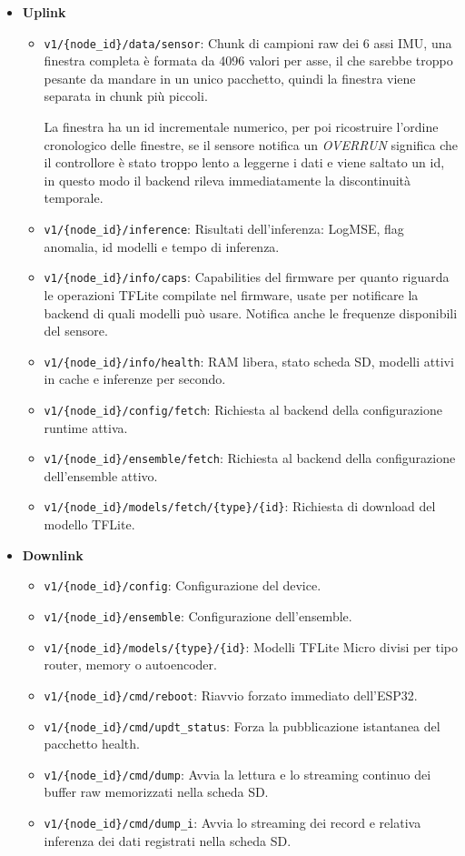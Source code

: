 \begin{itemize}
	\item \textbf{Uplink}
	\begin{itemize}
		\item \texttt{v1/\{node\_id\}/data/sensor}: Chunk di campioni raw dei 6 assi IMU, una finestra completa è formata da 4096 valori per asse, il che sarebbe troppo pesante da mandare in un unico pacchetto, quindi la finestra viene separata in chunk più piccoli. %

		La finestra ha un id incrementale numerico, per poi ricostruire l'ordine cronologico delle finestre, se il sensore notifica un \textit{OVERRUN} significa che il controllore è stato troppo lento a leggerne i dati e viene saltato un id, in questo modo il backend rileva immediatamente la discontinuità temporale.

		\item \texttt{v1/\{node\_id\}/inference}: Risultati dell'inferenza: LogMSE, flag anomalia, id modelli e tempo di inferenza.
		\item \texttt{v1/\{node\_id\}/info/caps}: Capabilities del firmware per quanto riguarda le operazioni TFLite compilate nel firmware, usate per notificare la backend di quali modelli può usare. Notifica anche le frequenze disponibili del sensore.
		\item \texttt{v1/\{node\_id\}/info/health}: RAM libera, stato scheda SD, modelli attivi in cache e inferenze per secondo.
		\item \texttt{v1/\{node\_id\}/config/fetch}: Richiesta al backend della configurazione runtime attiva.
		\item \texttt{v1/\{node\_id\}/ensemble/fetch}: Richiesta al backend della configurazione dell'ensemble attivo.
		\item \texttt{v1/\{node\_id\}/models/fetch/\{type\}/\{id\}}: Richiesta di download del modello TFLite.
	\end{itemize}

	\item \textbf{Downlink}
	\begin{itemize}
		\item \texttt{v1/\{node\_id\}/config}: Configurazione del device.
		\item \texttt{v1/\{node\_id\}/ensemble}: Configurazione dell'ensemble.
		\item \texttt{v1/\{node\_id\}/models/\{type\}/\{id\}}: Modelli TFLite Micro divisi per tipo router, memory o autoencoder.
		\item \texttt{v1/\{node\_id\}/cmd/reboot}: Riavvio forzato immediato dell'ESP32.
		\item \texttt{v1/\{node\_id\}/cmd/updt\_status}: Forza la pubblicazione istantanea del pacchetto health.
		\item \texttt{v1/\{node\_id\}/cmd/dump}: Avvia la lettura e lo streaming continuo dei buffer raw memorizzati nella scheda SD.
		\item \texttt{v1/\{node\_id\}/cmd/dump\_i}: Avvia lo streaming dei record e relativa inferenza dei dati registrati nella scheda SD.
	\end{itemize}
\end{itemize}

